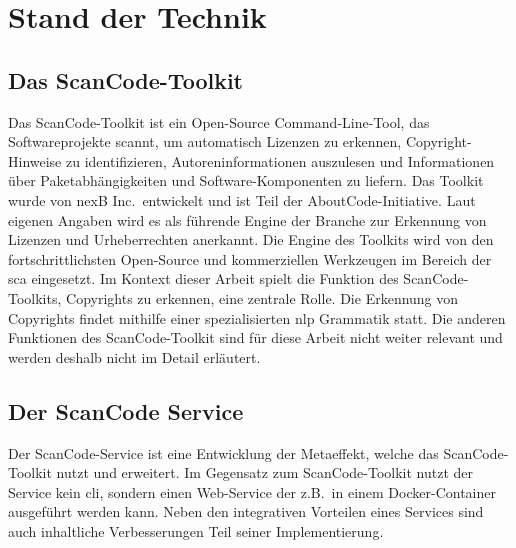 \chapter{Stand der Technik}\label{ch:stand-der-technik}


\section{Das ScanCode-Toolkit}\label{sec:scancode-toolkit}

Das ScanCode-Toolkit ist ein Open-Source Command-Line-Tool, das Softwareprojekte scannt, um automatisch Lizenzen zu erkennen, Copyright-Hinweise zu identifizieren, Autoreninformationen auszulesen und Informationen über Paketabhängigkeiten und Software-Komponenten zu liefern.
Das Toolkit wurde von nexB Inc.\ entwickelt und ist Teil der AboutCode-Initiative.
Laut eigenen Angaben wird es als führende Engine der Branche zur Erkennung von Lizenzen und Urheberrechten anerkannt.
Die Engine des Toolkits wird von den fortschrittlichsten Open-Source und kommerziellen Werkzeugen im Bereich der \gls{sca} eingesetzt.
Im Kontext dieser Arbeit spielt die Funktion des ScanCode-Toolkits, Copyrights zu erkennen, eine zentrale Rolle.
Die Erkennung von Copyrights findet mithilfe einer spezialisierten \gls{nlp} Grammatik statt.
Die anderen Funktionen des ScanCode-Toolkit sind für diese Arbeit nicht weiter relevant und werden deshalb nicht im Detail erläutert\autocite{noauthor_scancode-toolkit-documentation_nodate}.



\section{Der ScanCode Service}\label{sec:scancode-service}

Der ScanCode-Service ist eine Entwicklung der Metaeffekt, welche das ScanCode-Toolkit nutzt und erweitert.
Im Gegensatz zum ScanCode-Toolkit nutzt der Service kein \gls{cli}, sondern einen Web-Service der z.B.\ in einem Docker-Container ausgeführt werden kann.
Neben den integrativen Vorteilen eines Services sind auch inhaltliche Verbesserungen Teil seiner Implementierung.

